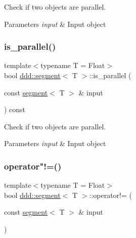 Check if two objects are parallel. 


\begin{DoxyParams}{Parameters}
{\em input} & Input object \\
\hline
\end{DoxyParams}
\mbox{\label{classddd_1_1segment_a0fab67ddfefa1cc41bf8677387bd5492}} 
\subsubsection{\texorpdfstring{is\+\_\+parallel()}{is\_parallel()}\hspace{0.1cm}{\footnotesize\ttfamily [5/5]}}
{\footnotesize\ttfamily template$<$typename T = Float$>$ \\
bool \hyperlink{classddd_1_1segment}{ddd\+::segment}$<$ T $>$\+::is\+\_\+parallel (\begin{DoxyParamCaption}\item[{const \hyperlink{classddd_1_1segment}{segment}$<$ T $>$ \&}]{input }\end{DoxyParamCaption}) const\hspace{0.3cm}{\ttfamily [inline]}}



Check if two objects are parallel. 


\begin{DoxyParams}{Parameters}
{\em input} & Input object \\
\hline
\end{DoxyParams}
\mbox{\label{classddd_1_1segment_ab9517c79cc771551a50fb30e307e7807}} 
\subsubsection{\texorpdfstring{operator"!=()}{operator!=()}}
{\footnotesize\ttfamily template$<$typename T = Float$>$ \\
bool \hyperlink{classddd_1_1segment}{ddd\+::segment}$<$ T $>$\+::operator!= (\begin{DoxyParamCaption}\item[{const \hyperlink{classddd_1_1segment}{segment}$<$ T $>$ \&}]{input }\end{DoxyParamCaption})\hspace{0.3cm}{\ttfamily [inline]}}




